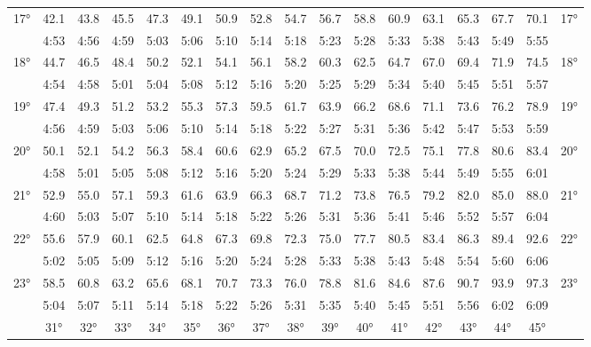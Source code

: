 \begin{footnotesize}
\begin{tabular}{c || c | c | c | c | c | c | c | c | c | c | c | c | c | c | c || c}
		\multirow{2}{*}{17°}&42.1&43.8&45.5&47.3&49.1&50.9&52.8&54.7&56.7&58.8&60.9&63.1&65.3&67.7&70.1&\multirow{2}{*}{17°}\\ \space&4:53&4:56&4:59&5:03&5:06&5:10&5:14&5:18&5:23&5:28&5:33&5:38&5:43&5:49&5:55&\space\\\hline
		\multirow{2}{*}{18°}&44.7&46.5&48.4&50.2&52.1&54.1&56.1&58.2&60.3&62.5&64.7&67.0&69.4&71.9&74.5&\multirow{2}{*}{18°}\\ \space&4:54&4:58&5:01&5:04&5:08&5:12&5:16&5:20&5:25&5:29&5:34&5:40&5:45&5:51&5:57&\space\\\hline
		\multirow{2}{*}{19°}&47.4&49.3&51.2&53.2&55.3&57.3&59.5&61.7&63.9&66.2&68.6&71.1&73.6&76.2&78.9&\multirow{2}{*}{19°}\\ \space&4:56&4:59&5:03&5:06&5:10&5:14&5:18&5:22&5:27&5:31&5:36&5:42&5:47&5:53&5:59&\space\\\hline
		\multirow{2}{*}{20°}&50.1&52.1&54.2&56.3&58.4&60.6&62.9&65.2&67.5&70.0&72.5&75.1&77.8&80.6&83.4&\multirow{2}{*}{20°}\\ \space&4:58&5:01&5:05&5:08&5:12&5:16&5:20&5:24&5:29&5:33&5:38&5:44&5:49&5:55&6:01&\space\\\hline
		\multirow{2}{*}{21°}&52.9&55.0&57.1&59.3&61.6&63.9&66.3&68.7&71.2&73.8&76.5&79.2&82.0&85.0&88.0&\multirow{2}{*}{21°}\\ \space&4:60&5:03&5:07&5:10&5:14&5:18&5:22&5:26&5:31&5:36&5:41&5:46&5:52&5:57&6:04&\space\\\hline
		\multirow{2}{*}{22°}&55.6&57.9&60.1&62.5&64.8&67.3&69.8&72.3&75.0&77.7&80.5&83.4&86.3&89.4&92.6&\multirow{2}{*}{22°}\\ \space&5:02&5:05&5:09&5:12&5:16&5:20&5:24&5:28&5:33&5:38&5:43&5:48&5:54&5:60&6:06&\space\\\hline
		\multirow{2}{*}{23°}&58.5&60.8&63.2&65.6&68.1&70.7&73.3&76.0&78.8&81.6&84.6&87.6&90.7&93.9&97.3&\multirow{2}{*}{23°}\\ \space&5:04&5:07&5:11&5:14&5:18&5:22&5:26&5:31&5:35&5:40&5:45&5:51&5:56&6:02&6:09&\space\\\hline
		\hline\space &31°&32°&33°&34°&35°&36°&37°&38°&39°&40°&41°&42°&43°&44°&45°
\end{tabular}\end{footnotesize}

